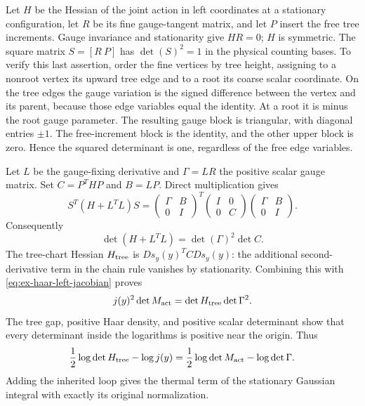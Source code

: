 Let $H$ be the Hessian of the joint action in left coordinates at a
stationary configuration, let $R$ be its fine gauge-tangent matrix,
and let $P$ insert the free tree increments. Gauge invariance and
stationarity give $HR=0$; $H$ is symmetric. The square matrix
$S=[R\ P]$ has $\det(S)^2=1$ in the physical counting bases.
To verify this last assertion, order the fine vertices by tree
height, assigning to a nonroot vertex its upward tree edge and to
a root its coarse scalar coordinate. On the tree edges the gauge
variation is the signed difference between the vertex and its parent,
because those edge variables equal the identity. At a root it is
minus the root gauge parameter. The resulting gauge block is
triangular, with diagonal entries $\pm1$. The free-increment block
is the identity, and the other upper block is zero. Hence the
squared determinant is one, regardless of the free edge variables.

Let $L$ be the gauge-fixing derivative and $\Gamma=LR$ the positive
scalar gauge matrix. Set $C=P^THP$ and $B=LP$. Direct multiplication
gives
\[
 S^T(H+L^TL)S=
 \begin{pmatrix}\Gamma&B\\0&I\end{pmatrix}^{\!T}
 \begin{pmatrix}I&0\\0&C\end{pmatrix}
 \begin{pmatrix}\Gamma&B\\0&I\end{pmatrix}.
\]
Consequently
\begin{equation}\label{eq:ex-gauge-det-factorization}
                  \det(H+L^TL)=\det(\Gamma)^2\det C.
\end{equation}
The tree-chart Hessian $H_{\rm tree}$ is
$Ds_y(y)^T C Ds_y(y)$: the additional second-derivative term in
the chain rule vanishes by stationarity. Combining this with
\eqref{eq:ex-haar-left-jacobian} proves
\[
 j(y)^2\det M_{\rm act}=\det H_{\rm tree}\det\Gamma^2.
\]
The tree gap, positive Haar density, and positive scalar determinant
show that every determinant inside the logarithms is positive near
the origin. Thus
\begin{equation}\label{eq:ex-thermal-determinant}
 \frac12\log\det H_{\rm tree}-\log j(y)
       =\frac12\log\det M_{\rm act}-\log\det\Gamma.
\end{equation}
Adding the inherited loop gives the thermal term of the stationary
Gaussian integral with exactly its original normalization.

